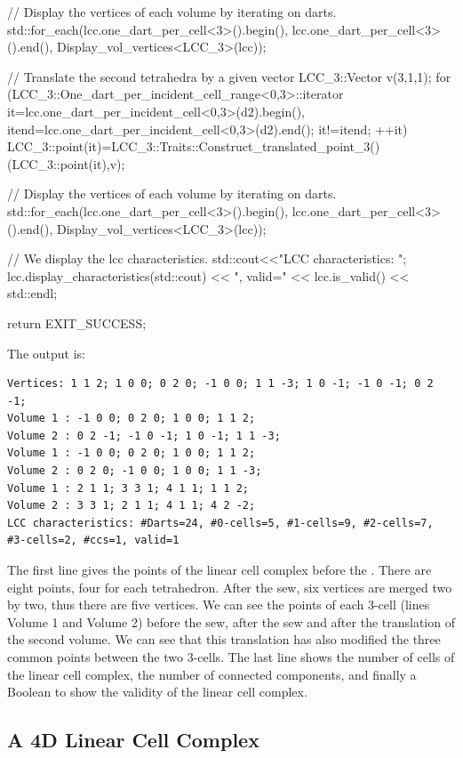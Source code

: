 \begin{ccExampleCode}
{  // Display the vertices of each volume by iterating on darts.
  std::for_each(lcc.one_dart_per_cell<3>().begin(),
                lcc.one_dart_per_cell<3>().end(),
                Display_vol_vertices<LCC_3>(lcc));  

  // Translate the second tetrahedra by a given vector
  LCC_3::Vector v(3,1,1);
  for (LCC_3::One_dart_per_incident_cell_range<0,3>::iterator 
       it=lcc.one_dart_per_incident_cell<0,3>(d2).begin(),
       itend=lcc.one_dart_per_incident_cell<0,3>(d2).end();
       it!=itend; ++it)
    {
      LCC_3::point(it)=LCC_3::Traits::Construct_translated_point_3()
          (LCC_3::point(it),v);
    }

  // Display the vertices of each volume by iterating on darts.
  std::for_each(lcc.one_dart_per_cell<3>().begin(),
                lcc.one_dart_per_cell<3>().end(),
                Display_vol_vertices<LCC_3>(lcc));  

  // We display the lcc characteristics.
  std::cout<<"LCC characteristics: ";
  lcc.display_characteristics(std::cout) << ", valid=" 
                 << lcc.is_valid() << std::endl;

  return EXIT_SUCCESS;
}
\end{ccExampleCode}

The output is:
\begin{verbatim}
Vertices: 1 1 2; 1 0 0; 0 2 0; -1 0 0; 1 1 -3; 1 0 -1; -1 0 -1; 0 2 -1; 
Volume 1 : -1 0 0; 0 2 0; 1 0 0; 1 1 2; 
Volume 2 : 0 2 -1; -1 0 -1; 1 0 -1; 1 1 -3; 
Volume 1 : -1 0 0; 0 2 0; 1 0 0; 1 1 2; 
Volume 2 : 0 2 0; -1 0 0; 1 0 0; 1 1 -3; 
Volume 1 : 2 1 1; 3 3 1; 4 1 1; 1 1 2; 
Volume 2 : 3 3 1; 2 1 1; 4 1 1; 4 2 -2; 
LCC characteristics: #Darts=24, #0-cells=5, #1-cells=9, #2-cells=7, #3-cells=2, #ccs=1, valid=1
\end{verbatim}

The first line gives the points of the linear cell complex before the
. There are eight points, four for each tetrahedron.
After the sew, six vertices are merged two by two, thus there are five
vertices. We can see the points of each 3-cell (lines Volume 1 and
Volume 2) before the sew, after the sew and after the translation of
the second volume.  We can see that this translation has also modified
the three common points between the two 3-cells.  The last line shows
the number of cells of the linear cell complex, the number of
connected components, and finally a Boolean to show the validity of
the linear cell complex.

\subsection{A 4D Linear Cell Complex}\label{ssec-5dexample}

